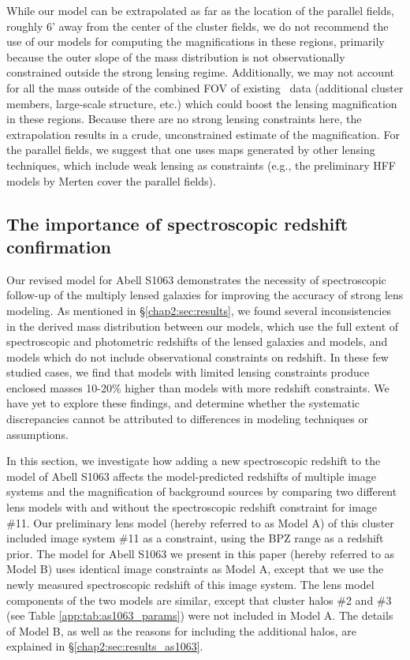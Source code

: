 While our model can be extrapolated as far as the location of the parallel fields, roughly 6' away from the center of the cluster fields, we do not recommend the use of our models for computing the magnifications in these regions, primarily because the outer slope of the mass distribution is not observationally constrained outside the strong lensing regime. Additionally, we may not account for all the mass outside of the combined FOV of existing \hst\ data (additional cluster members, large-scale structure, etc.) which could boost the lensing magnification in these regions. Because there are no strong lensing constraints here, the extrapolation results in a crude, unconstrained estimate of the magnification. For the parallel fields, we suggest that one uses maps generated by other lensing techniques, which include weak lensing as constraints (e.g., the preliminary HFF models by Merten cover the parallel fields).

\subsection{The importance of spectroscopic redshift confirmation}
\label{chap2:sec:specz}
Our revised model for Abell S1063 demonstrates the necessity of spectroscopic follow-up of the multiply lensed galaxies for improving the accuracy of strong lens modeling. As mentioned in \S \ref{chap2:sec:results}, we found several inconsistencies in the derived mass distribution between our models, which use the full extent of spectroscopic and photometric redshifts of the lensed galaxies and models, and models which do not include observational constraints on redshift. In these few studied cases, we find that models with limited lensing constraints produce enclosed masses 10-20\% higher than models with more redshift constraints. We have yet to explore these findings, and determine whether the systematic discrepancies cannot be attributed to differences in modeling techniques or assumptions.

In this section, we investigate how adding a new spectroscopic redshift to the model of Abell S1063 affects the model-predicted redshifts of multiple image systems and the magnification of background sources by comparing two different lens models with and without the spectroscopic redshift constraint for image \#11. Our preliminary lens model (hereby referred to as Model A) of this cluster included image system \#11 as a constraint, using the BPZ range as a redshift prior. The model for Abell S1063 we present in this paper (hereby referred to as Model B) uses identical image constraints as Model A, except that we use the newly measured spectroscopic redshift of this image system. The lens model components of the two models are similar, except that cluster halos \#2 and \#3 (see Table \ref{app:tab:as1063_params}) were not included in Model A. The details of Model B, as well as the reasons for including the additional halos, are explained in \S \ref{chap2:sec:results_as1063}.

